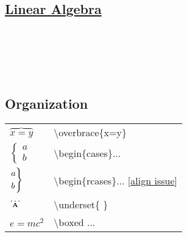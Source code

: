 \subsection*{\href{https://www.overleaf.com/learn/latex/Matrices}{Linear Algebra}}

\\
\\
\\
\\


\subsection*{Organization}
\begin{tabular}{l l}

$\overbrace{x=y}$ &  \textbackslash overbrace\{x=y\} \\
$\begin{cases} a \\ b \end{cases}$ & \textbackslash begin\{cases\}... \\
$\begin{rcases} a \\ b \end{rcases}$ & \textbackslash begin\{rcases\}... [\href{https://tex.stackexchange.com/questions/385148/spacing-in-cases}{align issue}]\\
$\underset{\bf A}\dots$ & \textbackslash underset\{ \} \\
$\boxed{e=mc^2}$ & \textbackslash boxed ... \\


\end{tabular}\ \\

